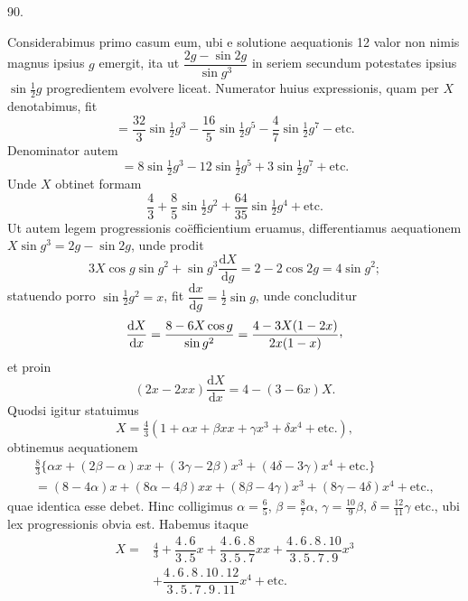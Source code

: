 \par{}\medskip
\hypertarget{native-121-article090}{}
\begin{center}90.\end{center}
Considerabimus primo casum eum, ubi e solutione aequationis 12 valor non nimis magnus ipsius $g$ emergit, ita ut $\dfrac{2g-\sin 2g}{\sin g^3}$ in seriem secundum potestates ipsius $\sin\tfrac12 g$ progredientem evolvere liceat. Numerator huius expressionis, quam per $X$ denotabimus, fit
\[
=\dfrac{32}{3}\sin\tfrac12 g^3-\dfrac{16}{5}\sin\tfrac12 g^5-\dfrac47\sin\tfrac12 g^7-\text{etc.}
\]
Denominator autem
\[
=8\sin\tfrac12 g^3-12\sin\tfrac12 g^5+3\sin\tfrac12 g^7+\text{etc.}
\]
Unde $X$ obtinet formam
\[
\dfrac43+\dfrac85\sin\tfrac12 g^2+\dfrac{64}{35}\sin\tfrac12 g^4+\text{etc.}
\]
Ut autem legem progressionis coëfficientium eruamus, differentiamus aequationem $X\sin g^3=2g-\sin 2g$, unde prodit
\[
3X\cos g\sin g^2+\sin g^3\dfrac{\mathrm{d}X}{\mathrm{d}g}=2-2\cos 2g=4\sin g^2;
\]
statuendo porro $\sin\tfrac12 g^2=x$, fit $\dfrac{\mathrm{d}x}{\mathrm{d}g}=\tfrac12\sin g$, unde concluditur
\[
\dfrac{\mathrm{d}X}{\mathrm{d}x}=\dfrac{8-6X\cos g}{\sin g^2}=\dfrac{4-3X(1-2x)}{2x(1-x)}\mathpunct{\raisebox{.45ex}{,}}
\]
et proin
\[
(2x-2xx)\dfrac{\mathrm{d}X}{\mathrm{d}x}=4-(3-6x)X.
\]
Quodsi igitur statuimus
\[
X=\tfrac43(1+\alpha x+\beta xx+\gamma x^3+\delta x^4+\text{etc.}),
\]
obtinemus aequationem
\[
\begin{gathered}
\tfrac83\{\alpha x+(2\beta-\alpha)xx+(3\gamma-2\beta)x^3+(4\delta-3\gamma)x^4+\text{etc.}\}
\\[4pt]
=(8-4\alpha)x+(8\alpha-4\beta)xx+(8\beta-4\gamma)x^3+(8\gamma-4\delta)x^4+\text{etc.},
\end{gathered}
\]
quae identica esse debet. Hinc colligimus $\alpha=\tfrac65$, $\beta=\tfrac87\alpha$, $\gamma=\tfrac{10}{9}\beta$, $\delta=\tfrac{12}{11}\gamma$ etc., ubi lex progressionis obvia est. Habemus itaque
\[
\begin{aligned}
X={}&\tfrac43+\dfrac{4\mathbin{.}6}{3\mathbin{.}5}x+\dfrac{4\mathbin{.}6\mathbin{.}8}{3\mathbin{.}5\mathbin{.}7}xx+\dfrac{4\mathbin{.}6\mathbin{.}8\mathbin{.}10}{3\mathbin{.}5\mathbin{.}7\mathbin{.}9}x^3
\\[4pt]
&+\dfrac{4\mathbin{.}6\mathbin{.}8\mathbin{.}10\mathbin{.}12}{3\mathbin{.}5\mathbin{.}7\mathbin{.}9\mathbin{.}11}x^4+\text{etc.}
\end{aligned}
\]

